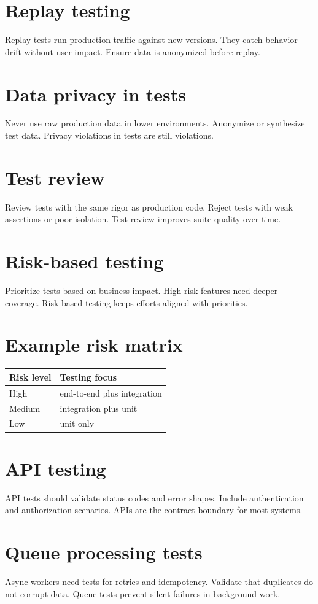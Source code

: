 \section{Replay testing}
Replay tests run production traffic against new versions.
They catch behavior drift without user impact.
Ensure data is anonymized before replay.

\section{Data privacy in tests}
Never use raw production data in lower environments.
Anonymize or synthesize test data.
Privacy violations in tests are still violations.

\section{Test review}
Review tests with the same rigor as production code.
Reject tests with weak assertions or poor isolation.
Test review improves suite quality over time.

\section{Risk-based testing}
Prioritize tests based on business impact.
High-risk features need deeper coverage.
Risk-based testing keeps efforts aligned with priorities.

\section{Example risk matrix}
\begin{tabularx}{\textwidth}{@{}lX@{}}
\toprule
Risk level & Testing focus \\
\midrule
High & end-to-end plus integration \\
Medium & integration plus unit \\
Low & unit only \\
\bottomrule
\end{tabularx}

\section{API testing}
API tests should validate status codes and error shapes.
Include authentication and authorization scenarios.
APIs are the contract boundary for most systems.

\section{Queue processing tests}
Async workers need tests for retries and idempotency.
Validate that duplicates do not corrupt data.
Queue tests prevent silent failures in background work.

